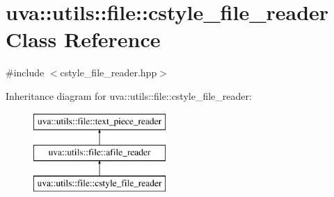 \hypertarget{classuva_1_1utils_1_1file_1_1cstyle__file__reader}{}\section{uva\+:\+:utils\+:\+:file\+:\+:cstyle\+\_\+file\+\_\+reader Class Reference}
\label{classuva_1_1utils_1_1file_1_1cstyle__file__reader}


{\ttfamily \#include $<$cstyle\+\_\+file\+\_\+reader.\+hpp$>$}

Inheritance diagram for uva\+:\+:utils\+:\+:file\+:\+:cstyle\+\_\+file\+\_\+reader\+:\begin{figure}[H]
\begin{center}
\leavevmode
\includegraphics[height=3.000000cm]{classuva_1_1utils_1_1file_1_1cstyle__file__reader}
\end{center}
\end{figure}
